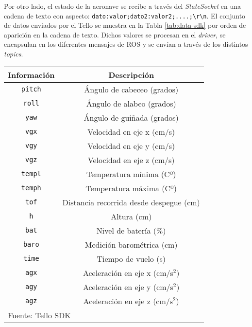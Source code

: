 \documentclass[../main.tex]{subfiles}
\begin{document}
Por otro lado, el estado de la aeronave se recibe a través del \emph{StateSocket} en una cadena de texto con aspecto: \lstinline{dato:valor;dato2:valor2;....;\r\n}. El conjunto de datos enviados por el Tello se muestra en la Tabla \ref{tab:data-sdk} por orden de aparición en la cadena de texto. Dichos valores se procesan en el \emph{driver}, se encapsulan en los diferentes mensajes de ROS y se envían a través de los distintos \emph{topics}.

\begin{table}[H]
	{\begin{tabular}{|c|c|}
		\hline
		\textbf{Información} & \textbf{Descripción} \\
		\hline
        \lstinline{pitch} & Ángulo de cabeceo (grados) \\
		\hline
        \lstinline{roll} & Ángulo de alabeo (grados) \\
		\hline
        \lstinline{yaw} & Ángulo de guiñada (grados) \\
		\hline
        \lstinline{vgx} & Velocidad en eje x (cm/s) \\
		\hline
        \lstinline{vgy} & Velocidad en eje y (cm/s) \\
		\hline
        \lstinline{vgz} & Velocidad en eje z (cm/s) \\
		\hline
        \lstinline{templ} & Temperatura mínima (Cº) \\
		\hline
        \lstinline{temph} & Temperatura máxima (Cº) \\
		\hline
        \lstinline{tof} & Distancia recorrida desde despegue (cm) \\
		\hline
        \lstinline{h} & Altura (cm) \\
		\hline
        \lstinline{bat} & Nivel de batería (\%) \\
		\hline
        \lstinline{baro} & Medición barométrica (cm) \\
		\hline
        \lstinline{time} & Tiempo de vuelo (s) \\
		\hline
        \lstinline{agx} & Aceleración en eje x (cm/s$^2$) \\
		\hline
        \lstinline{agy} & Aceleración en eje y (cm/s$^2$) \\
		\hline
        \lstinline{agz} & Aceleración en eje z (cm/s$^2$) \\
		\hline
		\multicolumn{2}{l}{Fuente: Tello SDK}
	\end{tabular}}
\end{table}
\end{document}
